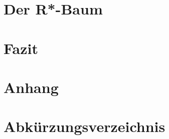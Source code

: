 \documentclass[runningheads,a4paper]{llncs}
\begin{document}

\section{Der R*-Baum} %
\label{sec:rstar_tree}




\section{Fazit} %
\label{sec:fazit}






\newpage
\begin{appendix}

	\section*{Anhang}

	\section*{Abkürzungsverzeichnis} %
	\label{sub:abbreviations}

		\begin{acronym}[length]
	  \end{acronym}



	\nocite{*}							%

	\printbibliography

\end{appendix}
\end{document}
